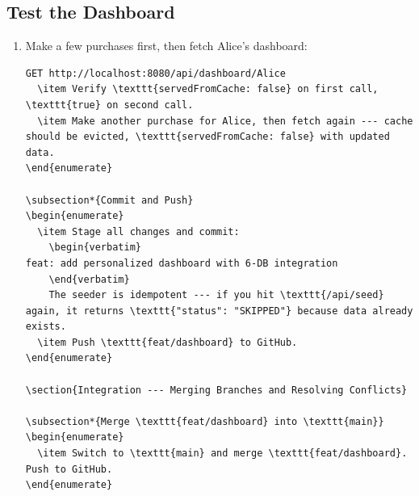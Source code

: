 \documentclass[a4paper]{article}
\begin{document}
\subsection*{Test the Dashboard}
\begin{enumerate}
  \item Make a few purchases first, then fetch Alice's dashboard:
    \begin{lstlisting}
GET http://localhost:8080/api/dashboard/Alice
  \item Verify \texttt{servedFromCache: false} on first call, \texttt{true} on second call.
  \item Make another purchase for Alice, then fetch again --- cache should be evicted, \texttt{servedFromCache: false} with updated data.
\end{enumerate}

\subsection*{Commit and Push}
\begin{enumerate}
  \item Stage all changes and commit:
    \begin{verbatim}
feat: add personalized dashboard with 6-DB integration
    \end{verbatim}
    The seeder is idempotent --- if you hit \texttt{/api/seed} again, it returns \texttt{"status": "SKIPPED"} because data already exists.
  \item Push \texttt{feat/dashboard} to GitHub.
\end{enumerate}

\section{Integration --- Merging Branches and Resolving Conflicts}

\subsection*{Merge \texttt{feat/dashboard} into \texttt{main}}
\begin{enumerate}
  \item Switch to \texttt{main} and merge \texttt{feat/dashboard}. Push to GitHub.
\end{enumerate}


\end{lstlisting}
\end{enumerate}
\end{document}
